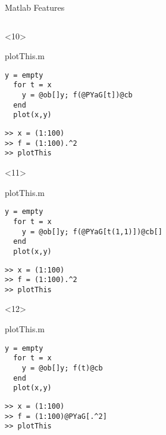 \begin{frame}[fragile]{Matlab Features}
\begin{columns}
\begin{column}[T]{5cm}
      \begin{onlyenv}<10>
        \begin{block}{plotThis.m}
          \begin{Verbatim}[commandchars=@\[\]]
  y = empty
  for t = x
    y = @ob[]y; f(@PYaG[t])@cb
  end
  plot(x,y)
          \end{Verbatim}
        \end{block}
          \begin{Verbatim}[commandchars=@\[\]]
>> x = (1:100)
>> f = (1:100).^2
>> plotThis
        \end{Verbatim}
      \end{onlyenv}

      \begin{onlyenv}<11>
        \begin{block}{plotThis.m}
          \begin{Verbatim}[commandchars=@\[\]]
  y = empty
  for t = x
    y = @ob[]y; f(@PYaG[t(1,1)])@cb[]
  end
  plot(x,y)
          \end{Verbatim}
        \end{block}
          \begin{Verbatim}[commandchars=@\[\]]
>> x = (1:100)
>> f = (1:100).^2 
>> plotThis
        \end{Verbatim}
      \end{onlyenv}
      \begin{onlyenv}<12>
        \begin{block}{plotThis.m}
          \begin{Verbatim}[commandchars=@\[\]]
  y = empty
  for t = x
    y = @ob[]y; f(t)@cb
  end
  plot(x,y)
          \end{Verbatim}
        \end{block}
          \begin{Verbatim}[commandchars=@\[\]]
>> x = (1:100)
>> f = (1:100)@PYaG[.^2] 
>> plotThis
        \end{Verbatim}
      \end{onlyenv}


\end{column}
\end{columns}
\end{frame}
